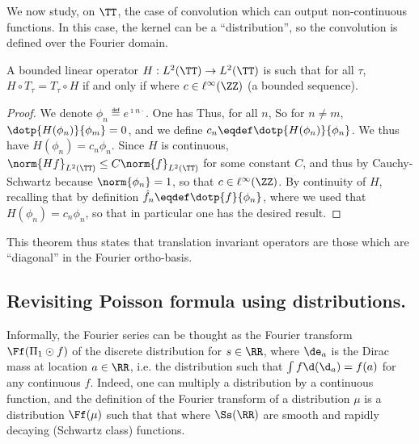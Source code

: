 We now study, on $\TT$, the case of convolution which can output non-continuous functions. In this case, the kernel can be a ``distribution'', so the convolution is defined over the Fourier domain. 

\begin{prop}\label{prop-ti-convol-l2}
 	A bounded linear operator $H : L^2(\TT) \rightarrow L^2(\TT)$ is such that for all $\tau$, $H \circ T_\tau = T_\tau \circ H$ if and only if 
	where $c \in \ell^\infty(\ZZ)$ (a bounded sequence).
\end{prop}
\begin{proof}
	We denote $\phi_n \eqdef e^{\imath n \cdot}$. 
	One has
	Thus, for all $n$, 
	So for $n \neq m$, $\dotp{H(\phi_n)}{\phi_m} = 0$, and we define $c_n \eqdef \dotp{H(\phi_n)}{\phi_n}$.
	We thus have $H(\phi_n) = c_n \phi_n$.
	Since $H$ is continuous, $\norm{Hf}_{L^2(\TT)} \leq C \norm{f}_{L^2(\TT)}$ for some constant $C$, and thus
	by Cauchy-Schwartz 
	because $\norm{\phi_n}=1$, so that $c \in \ell^\infty(\ZZ)$.
	By continuity of $H$, recalling that by definition $\hat f_n \eqdef \dotp{f}{\phi_n}$, 
	where we used that $H(\phi_n) = c_n \phi_n$, so that in particular one has the desired result.
\end{proof}

This theorem thus states that translation invariant operators are those which are ``diagonal'' in the Fourier ortho-basis. 

\subsection{Revisiting Poisson formula using distributions.}

Informally, the Fourier series
can be thought as the Fourier transform $\Ff( \Pi_1 \odot f )$ of the discrete distribution
for $s \in \RR$, 
where $\de_a$ is the Dirac mass at location $a \in \RR$, i.e. the distribution such that $\int f \d(\d_a)=f(a)$ for any continuous $f$. Indeed, one can multiply a distribution by a continuous function, and the definition of the Fourier transform of a distribution $\mu$ is a distribution $\Ff(\mu)$ such that that 
where $\Ss(\RR)$ are smooth and rapidly decaying (Schwartz class) functions.

